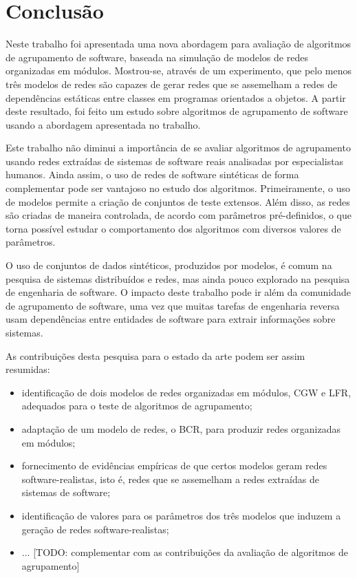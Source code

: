

\chapter{Conclusão} \label{cap:conclusao}

Neste trabalho foi apresentada uma nova abordagem para avaliação de algoritmos de agrupamento de software, baseada na simulação de modelos de redes organizadas em módulos. Mostrou-se, através de um experimento, que pelo menos três modelos de redes são capazes de gerar redes que se assemelham a redes de dependências estáticas entre classes em programas orientados a objetos. A partir deste resultado, foi feito um estudo sobre algoritmos de agrupamento de software usando a abordagem apresentada no trabalho.

Este trabalho não diminui a importância de se avaliar algoritmos de agrupamento usando redes extraídas de sistemas de software reais analisadas por especialistas humanos. Ainda assim, o uso de redes de software sintéticas de forma complementar pode ser vantajoso no estudo dos algoritmos. Primeiramente, o uso de modelos permite a criação de conjuntos de teste extensos. Além disso, as redes são criadas de maneira controlada, de acordo com parâmetros pré-definidos, o que torna possível estudar o comportamento dos algoritmos com diversos valores de parâmetros.

O uso de conjuntos de dados sintéticos, produzidos por modelos, é comum na pesquisa de sistemas distribuídos e redes, mas ainda pouco explorado na pesquisa de engenharia de software. O impacto deste trabalho pode ir além da comunidade de agrupamento de software, uma vez que muitas tarefas de engenharia reversa usam dependências entre entidades de software para extrair informações sobre sistemas.

As contribuições desta pesquisa para o estado da arte podem ser assim resumidas:

\begin{itemize}
	\item identificação de dois modelos de redes organizadas em módulos, CGW e LFR, adequados para o teste de algoritmos de agrupamento;
	\item adaptação de um modelo de redes, o BCR, para produzir redes organizadas em módulos;
	\item fornecimento de evidências empíricas de que certos modelos geram redes software-realistas, isto é, redes que se assemelham a redes extraídas de sistemas de software;
	\item identificação de valores para os parâmetros dos três modelos que induzem a geração de redes software-realistas;
	\item ... [TODO: complementar com as contribuições da avaliação de algoritmos de agrupamento]
\end{itemize}

